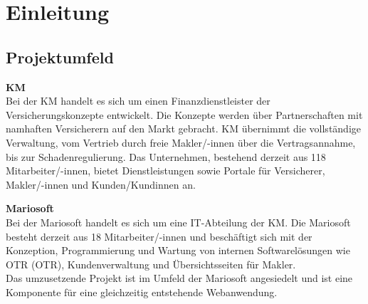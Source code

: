 
\section{Einleitung}
\label{einleitung}

\subsection{Projektumfeld}
\label{projektumfeld}
\textbf{\acl{KM}}
\\
Bei der \ac{KM} handelt es sich um einen Finanzdienstleister der Versicherungskonzepte entwickelt. Die Konzepte werden über Partnerschaften mit namhaften Versicherern auf den Markt gebracht. \ac{KM} übernimmt die vollständige Verwaltung, vom Vertrieb durch freie Makler/-innen über die Vertragsannahme, bis zur Schadenregulierung.
Das Unternehmen, bestehend derzeit aus 118 Mitarbeiter/-innen, bietet Dienstleistungen sowie Portale für Versicherer, Makler/-innen und Kunden/Kundinnen an.

\textbf{Mariosoft}
\\
Bei der Mariosoft handelt es sich um eine IT-Abteilung der \ac{KM}. Die Mariosoft besteht derzeit aus 18 Mitarbeiter/-innen und beschäftigt sich mit der Konzeption, Programmierung und Wartung von internen Softwarelösungen wie \acl{OTR} (\ac{OTR}), Kundenverwaltung und Übersichtsseiten für Makler.
\\
Das umzusetzende Projekt ist im Umfeld der Mariosoft angesiedelt und ist eine Komponente für eine gleichzeitig entstehende Webanwendung.

